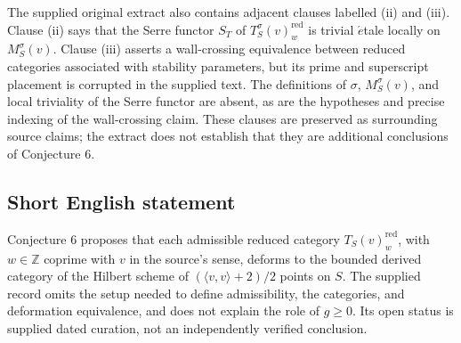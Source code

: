 \documentclass[11pt]{article}
\newcommand{\Z}{\mathbb{Z}}
\begin{document}
The supplied original extract also contains adjacent clauses labelled (ii) and (iii). Clause (ii) says that the Serre functor \(S_T\) of \(T_S^\sigma(v)_w^{\mathrm{red}}\) is trivial \(\acute{e}\)tale locally on \(M_S^\sigma(v)\). Clause (iii) asserts a wall-crossing equivalence between reduced categories associated with stability parameters, but its prime and superscript placement is corrupted in the supplied text. The definitions of \(\sigma\), \(M_S^\sigma(v)\), and local triviality of the Serre functor are absent, as are the hypotheses and precise indexing of the wall-crossing claim. These clauses are preserved as surrounding source claims; the extract does not establish that they are additional conclusions of Conjecture 6.
\subsection{Short English statement}
Conjecture 6 proposes that each admissible reduced category \(T_S(v)_w^{\mathrm{red}}\), with \(w\in\Z\) coprime with \(v\) in the source's sense, deforms to the bounded derived category of the Hilbert scheme of \((\langle v,v\rangle+2)/2\) points on \(S\). The supplied record omits the setup needed to define admissibility, the categories, and deformation equivalence, and does not explain the role of \(g\geq0\). Its open status is supplied dated curation, not an independently verified conclusion.
\end{document}
